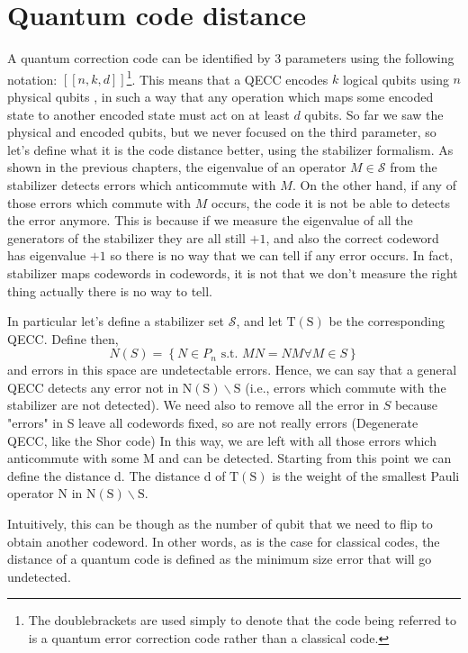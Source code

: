 \section{Quantum code distance}
A quantum correction code can be identified by 3 parameters using the following notation: $[[n, k, d]]$\footnote{The doublebrackets are used simply to denote that the code being referred to is a quantum error correction code rather than a classical code.}. This means that a QECC encodes $k$ logical qubits using $n$ physical qubits , in such a way that any operation which maps some encoded state to another encoded state must act on at least $d$ qubits. 
So far we saw the physical and encoded qubits, but we never focused on the third parameter, so let's define what it is the code distance better, using the stabilizer formalism. 
As shown in the previous chapters, the eigenvalue of an operator $M \in \mathcal{S}$ from the stabilizer detects errors which anticommute with $M$.
On the other hand, if any of those errors which commute with $M$ occurs, the code it is not be able to detects the error anymore. This is because if we measure the eigenvalue of all the generators of the stabilizer they are all still $+1$, and also the correct codeword has eigenvalue $+1$ so there is no way that we can tell if any error occurs. In fact, stabilizer maps codewords in codewords, it is not that we don't measure the right thing actually there is no way to tell. 

In particular let's define a stabilizer set $\mathcal{S}$, and let $\mathrm{T}(\mathrm{S})$ be the corresponding QECC.
Define then,
$$
N(S)=\left\{N \in P_{n} \text { s.t. } M N=N M \forall M \in S\right\}
$$
and errors in this space are undetectable errors. 
Hence, we can say that a general QECC detects any error not in $\mathrm{N}(\mathrm{S}) \backslash \mathrm{S}$ (i.e., errors which commute with the stabilizer are not detected). We need also to remove all the error in $S$ because "errors" in S leave all codewords fixed, so are not really errors (Degenerate QECC, like the Shor code)
In this way, we are left with all those errors which anticommute with some M and can be detected. Starting from this point we can define the distance d. 
The distance d of $\mathrm{T}(\mathrm{S})$ is the weight of the smallest Pauli operator $\mathrm{N}$ in $\mathrm{N}(\mathrm{S}) \backslash \mathrm{S}$.

Intuitively, this can be though as the number of qubit that we need to flip to obtain another codeword. In other words, as is the case for classical codes, the distance of a quantum code is defined as the minimum size error that will go undetected.

